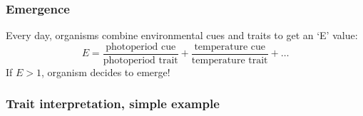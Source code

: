 \documentclass[pdf]{beamer}
\begin{document}
\begin{frame}
\frametitle{Emergence}
Every day, organisms combine environmental cues and traits to get an `E' value:\\
\[E=\frac{\text{photoperiod cue}}{\text{photoperiod trait}}+ \frac{\text{temperature cue}}{\text{temperature trait}}+\dots\]
If $E>1$, organism decides to emerge!
\end{frame}

\begin{frame}
\frametitle{Trait interpretation, simple example}
\begin{columns}



\end{columns}
\end{frame}
\end{document}
